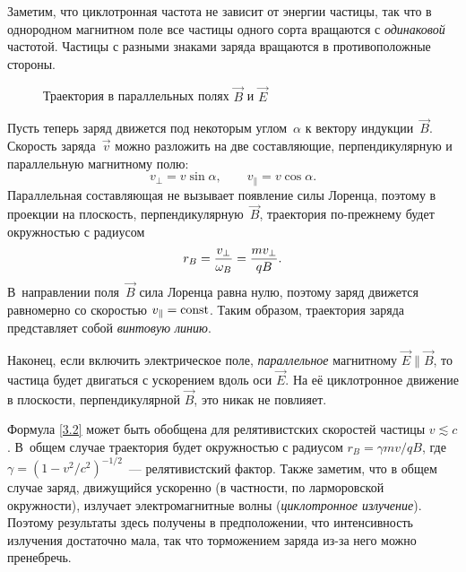 Заметим, что циклотронная частота не зависит от энергии частицы, так
что в однородном магнитном поле все частицы одного сорта вращаются с
\emph{одинаковой} частотой. Частицы с разными знаками заряда вращаются в
противоположные стороны.

\begin{wrapfigure}[13]{i}{0.27\textwidth}
\centering
 \caption{Траектория в параллельных полях $\vec{B}$ и $\vec{E}$}
\end{wrapfigure}

Пусть теперь заряд движется под некоторым углом~$\alpha$ к вектору
индукции~$\vec{B}$. Скорость заряда~$\vec{v}$ можно разложить
на две составляющие, перпендикулярную и параллельную магнитному полю:
\begin{equation*}
    v_{\perp}=v\sin\alpha,\qquad v_{\parallel}=v\cos\alpha.
\end{equation*}
Параллельная составляющая не вызывает появление силы Лоренца, поэтому
в проекции на плоскость, перпендикулярную~$\vec{B}$,
траектория по-прежнему будет окружностью с радиусом
\begin{equation}
    \eqmark{3.4}
    r_B = \frac{v_{\perp}}{\omega_B} = \frac{m v_{\perp}}{qB}.
\end{equation}
В~направлении поля~$\vec{B}$ сила Лоренца равна нулю, поэтому заряд движется
равномерно со скоростью $v_{\parallel}=\mathrm{const}$.
Таким образом, траектория заряда представляет собой \emph{винтовую линию}.

Наконец, если включить электрическое поле, \emph{параллельное}
магнитному $\vec{E}\parallel\vec{B}$, то частица будет двигаться с ускорением
вдоль оси $\vec{E}$. На её циклотронное движение в плоскости, перпендикулярной
$\vec{B}$, это никак не повлияет.

\begin{lab:note}
Формула \eqref{3.2} может быть обобщена для релятивистских скоростей частицы $v\lesssim c$. В~общем случае траектория будет окружностью с радиусом
$r_B = \gamma m v/qB$, где $\gamma = (1-v^2/c^2)^{-1/2}$~--- релятивистский фактор.
Также заметим, что в общем случае заряд, движущийся ускоренно (в частности,
по ларморовской окружности), излучает электромагнитные волны
(\emph{циклотронное излучение}). Поэтому результаты здесь получены в
предположении, что интенсивность излучения достаточно мала,
так что торможением заряда из-за него можно пренебречь.
\end{lab:note}



